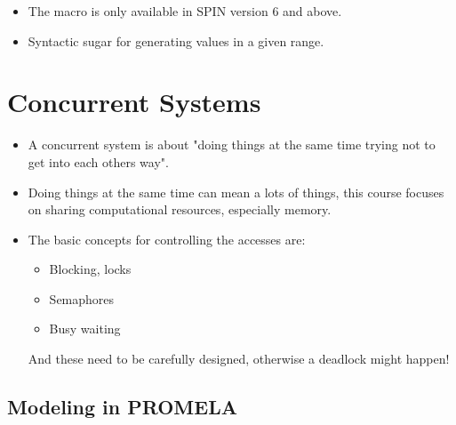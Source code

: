				\begin{itemize}
					\item The  macro is only available in SPIN version 6 and above.
					\item Syntactic sugar for generating values in a given range.
				\end{itemize}

	\section{Concurrent Systems}
		\begin{itemize}
			\item A concurrent system is about "doing things at the same time trying not to get into each others way".
			\item Doing things at the same time can mean a lots of things, this course focuses on sharing computational resources, especially memory.
			\item The basic concepts for controlling the accesses are:
				\begin{itemize}
					\item Blocking, locks
					\item Semaphores
					\item Busy waiting
				\end{itemize}
				And these need to be carefully designed, otherwise a deadlock might happen!
		\end{itemize}
	
		\subsection{Modeling in PROMELA}
			
		
